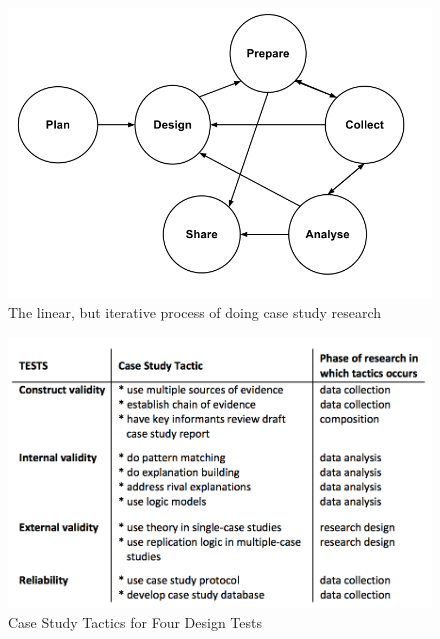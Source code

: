 \begin{figure}[H]
\begin{center}
\includegraphics[scale=0.38]{caseProcess.png}
\caption[Case Study Research Process]{The linear, but iterative process of doing case study research \cite{CaseStudyResearch}}
\label{fig:caseProcess}
\end{center}
\end{figure}

\begin{figure}[H]
\begin{center}
\includegraphics[scale=0.85]{caseTactics.png}
\caption[Case Study Tactics for Four Design Tests]{Case Study Tactics for Four Design Tests \cite{CaseStudyResearch}}
\label{fig:caseTactics}
\end{center}
\end{figure}